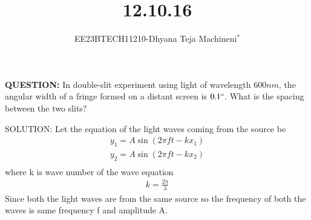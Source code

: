 \documentclass[journal,12pt,twocolumn]{IEEEtran}
\theoremstyle{remark}
\begin{document}

\vspace{3cm}
\title{\textbf{12.10.16}}
\author{EE23BTECH11210-Dhyana Teja Machineni$^{*}$%
}
\maketitle
\newpage
\bigskip

\textbf{QUESTION:}
In double-slit experiment using light of wavelength $600 nm$, the
angular width of a fringe formed on a distant screen is $0.1\degree$. What is
the spacing between the two slits?

SOLUTION:
Let the equation of the light waves coming from the source be
\begin{align}
y_1=A \sin(2\pi f t-k x_1)\\
y_2=A \sin(2\pi f t-k x_2)\\
\end{align}
where k is wave number of the wave equation
\begin{align}
k =\frac{2\pi}{\lambda}
\end{align}
Since both the light waves are from the same source so the frequency of both the waves is same frequency f and amplitude A.
\end{document}
